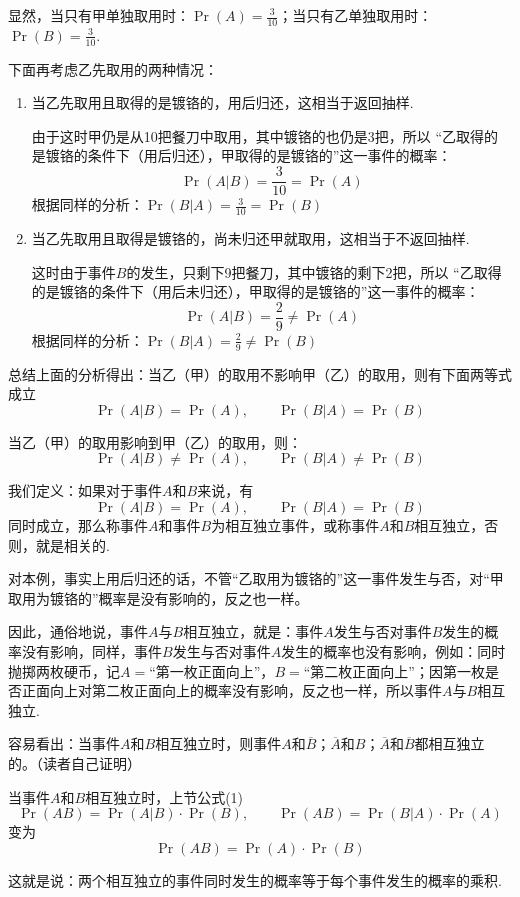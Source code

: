 显然，当只有甲单独取用时：$\Pr(A)=\frac{3}{10}$；当只有乙单独取用时：$\Pr(B)=\frac{3}{10}$.

下面再考虑乙先取用的两种情况：
\begin{enumerate}[(1)]
\item 当乙先取用且取得的是镀铬的，用后归还，这相当于返回抽样.

由于这时甲仍是从10把餐刀中取用，其中镀铬的也仍是3把，所以
“乙取得的是镀铬的条件下（用后归还），甲取得的是镀铬的”这一事件的概率：
\[\Pr(A|B)=\frac{3}{10}=\Pr(A)\]
根据同样的分析：$\Pr(B|A)=\frac{3}{10}=\Pr(B)$
\item 当乙先取用且取得是镀铬的，尚未归还甲就取用，这相当于不返回抽样.

这时由于事件$B$的发生，只剩下9把餐刀，其中镀铬的剩下2把，所以
“乙取得的是镀铬的条件下（用后未归还），甲取得的是镀铬的”这一事件的概率：
\[\Pr(A|B)=\frac{2}{9}\ne \Pr(A)\]
根据同样的分析：$\Pr(B|A)=\frac{2}{9}\ne \Pr(B)$
\end{enumerate}

总结上面的分析得出：当乙（甲）的取用不影响甲（乙）的取用，则有下面两等式成立
\[\Pr(A|B)=\Pr(A),\qquad \Pr(B|A)=\Pr(B)\]

当乙（甲）的取用影响到甲（乙）的取用，则：
\[\Pr(A|B)\ne \Pr(A),\qquad \Pr(B|A)\ne \Pr(B)\]

我们定义：如果对于事件$A$和$B$来说，有
\[\Pr(A|B)= \Pr(A),\qquad \Pr(B|A)= \Pr(B)\]
同时成立，那么称事件$A$和事件$B$为相互独立事件，或称事件$A$和$B$相互独立，否则，就是相关的.

对本例，事实上用后归还的话，不管“乙取用为镀铬的”这一事件发生与否，对“甲取用为镀铬的”概率是没有影响的，反之也一样。

因此，通俗地说，事件$A$与$B$相互独立，就是：事件$A$发生与否对事件$B$发生的概率没有影响，同样，事件$B$发生与否对事件$A$发生的概率也没有影响，例如：同时抛掷两枚硬币，记$A=$“第一枚正面向上”，$B=$“第二枚正面向上”；因第一枚是否正面向上对第二枚正面向上的概率没有影响，反之也一样，所以事件$A$与$B$相互独立.

容易看出：当事件$A$和$B$相互独立时，则事件$A$和$\overline{B}$；$\overline{A}$和$B$；$\overline{A}$和$\overline{B}$都相互独立的。（读者自己证明）

当事件$A$和$B$相互独立时，上节公式(1)
\[\Pr(AB)=\Pr(A|B)\cdot \Pr(B),\qquad \Pr(AB)=\Pr(B|A)\cdot \Pr(A)\]
变为
\begin{equation}
    \Pr(AB)=\Pr(A)\cdot \Pr(B) \tag{3}
\end{equation}

这就是说：两个相互独立的事件同时发生的概率等于每个事件发生的概率的乘积.

